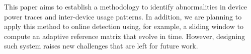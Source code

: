 This paper aims to establish a methodology to identify abnormalities in device power traces and inter-device usage patterns.
In addition, we are planning to apply this method to online detection using, for example, a sliding window to compute an adaptive reference matrix that evolve in time.
However, designing such system raises new challenges that are left for future work.

% 
% 
